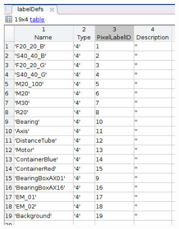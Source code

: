 	\begin{figure}[h]
		\begin{subfigure}{.5\textwidth}
			\centering
			\includegraphics[width=1\linewidth]{images/labelDef}
			\caption{}
			\label{Fig:labeldef}
		\end{subfigure}
		\begin{subfigure}{.5\textwidth}
			\centering

\end{subfigure}
\end{figure}
